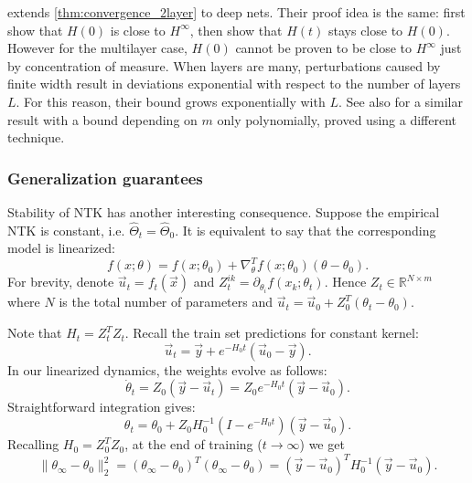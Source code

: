 \documentclass{article}
\newcommand{\RR}{\mathbb{R}}
\begin{document}
    \cite{du2019gradient} extends \cref{thm:convergence_2layer} to deep nets.
    Their proof idea is the same: first show that $H(0)$ is close to $H^\infty$, then show that $H(t)$ stays close to $H(0)$.
    However for the multilayer case, $H(0)$ cannot be proven to be close to $H^\infty$ just by concentration of measure.
    When layers are many, perturbations caused by finite width result in deviations exponential with respect to the number of layers $L$.
    For this reason, their bound grows exponentially with $L$.
    See also \cite{allen2019convergence} for a similar result with a bound depending on $m$ only polynomially, proved using a different technique.


    \subsubsection{Generalization guarantees}

    Stability of NTK has another interesting consequence.
    Suppose the empirical NTK is constant, i.e. $\hat\Theta_t = \hat\Theta_0$.
    It is equivalent to say that the corresponding model is linearized:
    \begin{equation}
        f(x; \theta)
        = f(x; \theta_0) + \nabla_\theta^T f(x; \theta_0) (\theta - \theta_0).
    \end{equation}
    For brevity, denote $\vec u_t = f_t(\vec x)$ and $Z_t^{ik} = \partial_{\theta_i} f(x_k; \theta_t)$.
    Hence $Z_t \in \RR^{N \times m}$ where $N$ is the total number of parameters and $\vec u_t = \vec u_0 + Z_0^T (\theta_t - \theta_0)$.

    Note that $H_t = Z_t^T Z_t$.
    Recall the train set predictions for constant kernel:
    \begin{equation}
        \vec u_t
        = \vec y + e^{-H_0 t} (\vec u_0 - \vec y).
    \end{equation}
    In our linearized dynamics, the weights evolve as follows:
    \begin{equation}
        \dot\theta_t
        = Z_0 (\vec y - \vec u_t)
        = Z_0 e^{-H_0 t} (\vec y - \vec u_0).
    \end{equation}
    Straightforward integration gives:
    \begin{equation}
        \theta_t
        = \theta_0 + Z_0 H_0^{-1} \left(I - e^{-H_0 t}\right) (\vec y - \vec u_0).
    \end{equation}
    Recalling $H_0 = Z_0^T Z_0$, at the end of training ($t \to \infty$) we get
    \begin{equation}
        \|\theta_\infty - \theta_0\|_2^2
        = (\theta_\infty - \theta_0)^T (\theta_\infty - \theta_0)
        = (\vec y - \vec u_0)^T H_0^{-1} (\vec y - \vec u_0).
    \end{equation}
\end{document}
